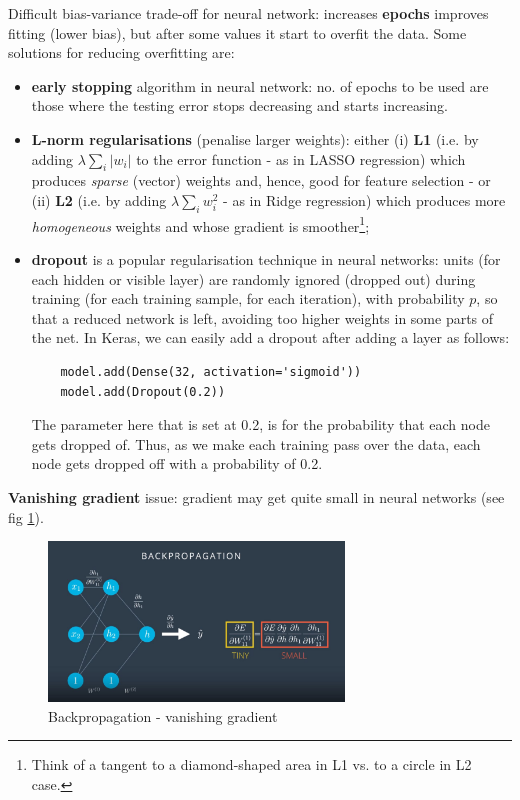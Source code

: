 \documentclass[11pt]{article}
\begin{document}
Difficult bias-variance trade-off for neural network: increases \textbf{epochs}  improves fitting (lower bias), but after some values it start to overfit the data. Some solutions  for reducing overfitting are:
\begin{itemize}
	\item \textbf{early stopping} algorithm in neural network: no. of epochs to be used are those where the testing error stops decreasing and starts increasing.
	\item \textbf{L-norm regularisations} (penalise larger weights): either (i) \textbf{L1} (i.e. by adding $\lambda \sum_i |w_i|$ to the error function - as in LASSO regression) which produces \textit{sparse} (vector) weights and, hence, good for feature selection - or (ii) \textbf{L2} (i.e. by adding $\lambda \sum_i w^2_i$ - as in Ridge regression) which produces more \textit{homogeneous} weights and whose gradient is smoother\footnote{Think of a tangent to a diamond-shaped area in L1 vs. to a circle in L2 case.};
	\item \textbf{dropout} is a popular regularisation technique in neural networks: units (for each hidden or visible layer) are randomly ignored (dropped out) during training  (for each training sample, for each iteration), with probability $p$, so that a reduced network is left, avoiding too higher weights in some parts of the net. In Keras, we can easily add a dropout after adding a layer as follows:
	\begin{lstlisting}
	model.add(Dense(32, activation='sigmoid'))
	model.add(Dropout(0.2))
	\end{lstlisting}
	The parameter here that is set at 0.2, is for the probability that each node gets dropped of. Thus, as we make each training pass over the data, each node gets dropped off with a probability of 0.2.
\end{itemize}


\textbf{Vanishing gradient} issue: gradient may get quite small in neural networks (see fig \ref{backpropagation3}).  
\begin{figure}[htbp] 
	\centering
	\includegraphics[width=0.7\textwidth]{pics/backpropagation3}
	\caption{Backpropagation - vanishing gradient} 
	\label{backpropagation3}
\end{figure}
\end{document}
